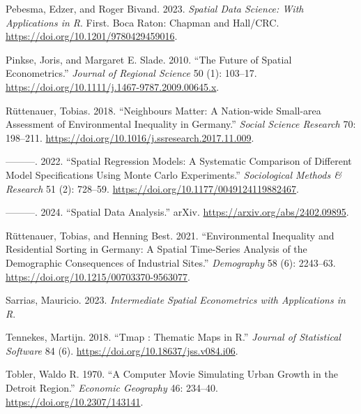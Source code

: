 \documentclass[
  letterpaper,
  DIV=11,
  numbers=noendperiod]{scrreprt}
\newlength{\cslhangindent}
\newlength{\cslentryspacingunit} %
\newenvironment{CSLReferences}[2] %
 {%
  \setlength{\parindent}{0pt}
  \ifodd #1
  \let\oldpar\par
  \def\par{\hangindent=\cslhangindent\oldpar}
  \fi
  \setlength{\parskip}{#2\cslentryspacingunit}
 }%
 {}
\begin{document}
\begin{CSLReferences}{1}{0}
\leavevmode{}%
Pebesma, Edzer, and Roger Bivand. 2023. \emph{Spatial {Data Science}:
{With Applications} in {R}}. First. {Boca Raton}: {Chapman and
Hall/CRC}. \url{https://doi.org/10.1201/9780429459016}.

\leavevmode{}%
Pinkse, Joris, and Margaret E. Slade. 2010. {``The {Future} of {Spatial
Econometrics}.''} \emph{Journal of Regional Science} 50 (1): 103--17.
\url{https://doi.org/10.1111/j.1467-9787.2009.00645.x}.

\leavevmode{}%
Rüttenauer, Tobias. 2018. {``Neighbours {Matter}: {A Nation-wide
Small-area Assessment} of {Environmental Inequality} in {Germany}.''}
\emph{Social Science Research} 70: 198--211.
\url{https://doi.org/10.1016/j.ssresearch.2017.11.009}.

\leavevmode{}%
---------. 2022. {``Spatial {Regression Models}: {A Systematic
Comparison} of {Different Model Specifications Using Monte Carlo
Experiments}.''} \emph{Sociological Methods \& Research} 51 (2):
728--59. \url{https://doi.org/10.1177/0049124119882467}.

\leavevmode{}%
---------. 2024. {``Spatial {Data Analysis}.''} {arXiv}.
\url{https://arxiv.org/abs/2402.09895}.

\leavevmode{}%
Rüttenauer, Tobias, and Henning Best. 2021. {``Environmental
{Inequality} and {Residential Sorting} in {Germany}: {A Spatial
Time-Series Analysis} of the {Demographic Consequences} of {Industrial
Sites}.''} \emph{Demography} 58 (6): 2243--63.
\url{https://doi.org/10.1215/00703370-9563077}.

\leavevmode{}%
Sarrias, Mauricio. 2023. \emph{Intermediate {Spatial Econometrics} with
{Applications} in {R}}.

\leavevmode{}%
Tennekes, Martijn. 2018. {``Tmap : {Thematic Maps} in {R}.''}
\emph{Journal of Statistical Software} 84 (6).
\url{https://doi.org/10.18637/jss.v084.i06}.

\leavevmode{}%
Tobler, Waldo R. 1970. {``A {Computer Movie Simulating Urban Growth} in
the {Detroit Region}.''} \emph{Economic Geography} 46: 234--40.
\url{https://doi.org/10.2307/143141}.


\end{CSLReferences}
\end{document}
